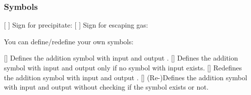 \documentclass[load-preamble+]{cnltx-doc}
\begin{document}
\begin{example}
  \par
\end{example}

\subsubsection{Symbols}\label{sec:symbols}
\begin{commands}
    [ ]
    Sign for precipitate:  
  [\Marg{ \textasciicircum\ } \ch{ ^ }]
    Sign for escaping gas\footnotemark: 
\end{commands}

You can define/redefine your own symbols:
\begin{commands}
  []
    Defines the addition symbol with input  and
    output .
  []
    Defines the addition symbol with input  and
    output  only if no symbol with input  exists.
  []
    Redefines the addition symbol with input 
    and output .
  []
    (Re-)Defines the addition symbol with input
     and output  without checking if the symbol
    exists or not.
\end{commands}
\end{document}
